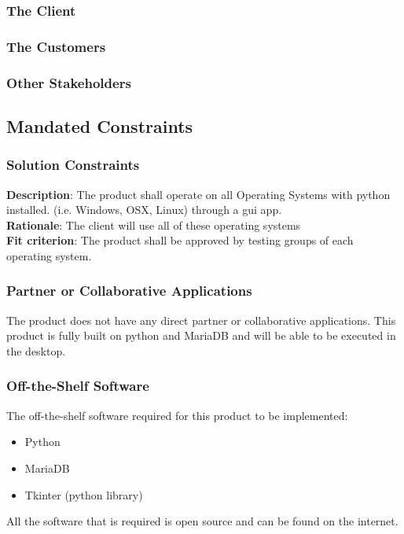 \documentclass[12pt, titlepage]{article}
\begin{document}
\subsubsection{The Client}

\subsubsection{The Customers}

\subsubsection{Other Stakeholders}

\subsection{Mandated Constraints}

\subsubsection{Solution Constraints}

\textbf{Description}: The product shall operate on all Operating Systems with python installed. (i.e. Windows, OSX, Linux) through a gui app.
\\
\textbf{Rationale}: The client will use all of these operating systems
\\
\textbf{Fit criterion}: The product shall be approved by testing groups of each operating system.

\subsubsection{Partner or Collaborative Applications}

The product does not have any direct partner or collaborative applications. This product is fully built on python and MariaDB and will be able to be executed in the desktop.

\subsubsection{Off-the-Shelf Software}

The off-the-shelf software required for this product to be implemented:
\begin{itemize}
\item Python
\item MariaDB
\item Tkinter (python library)
\end{itemize}
All the software that is required is open source and can be found on the internet.
\end{document}
